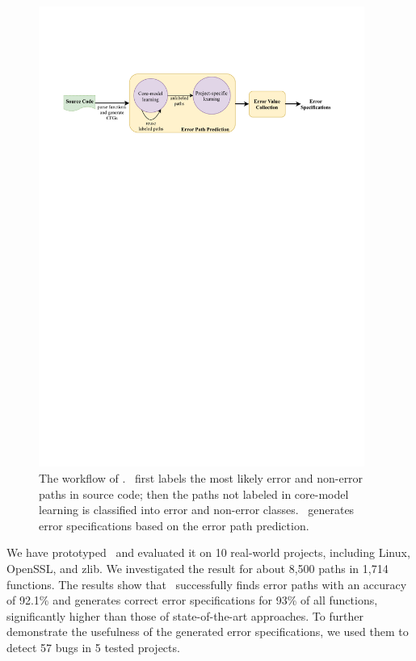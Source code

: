 \documentclass[12pt]{report}	%
\begin{document}
\begin{figure}
\includegraphics[width=0.95\textwidth]{images/errspec_arch.pdf}
\caption{The workflow of \newTool.
\newTool\ first labels the most likely error and non-error paths in source code;
then the paths not labeled in core-model learning is classified into error and non-error classes.
\newTool\ generates error specifications based on the error path prediction.
 }
\label{fig:workflow}
\end{figure}

We have prototyped \newTool\ and 
evaluated it on 
10 real-world projects, including Linux, OpenSSL, 
and zlib. We investigated the result for about 
8,500 paths in 1,714 functions. 
The results show that
\newTool\ successfully finds error paths with an accuracy of 92.1\%
and generates correct error specifications for 93\% of all functions,
significantly higher than those of state-of-the-art approaches.
%
To further demonstrate the usefulness of the generated error specifications,
we used them to detect 57 bugs in 5 tested projects.
\end{document}
